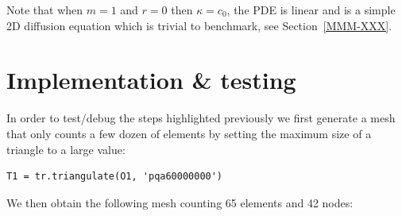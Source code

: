 Note that when $m=1$ and $r=0$ then $\kappa=c_0$, the PDE is linear and is a 
simple 2D diffusion equation which is trivial to benchmark, see Section~\ref{MMM-XXX}.






\newpage
\section*{Implementation \& testing}

In order to test/debug the steps highlighted previously we first generate a mesh that only
counts a few dozen of elements by setting the maximum size of a triangle to a large value:
\begin{lstlisting}
T1 = tr.triangulate(O1, 'pqa60000000')
\end{lstlisting}
We then obtain the following mesh counting 65 elements and 42 nodes:

